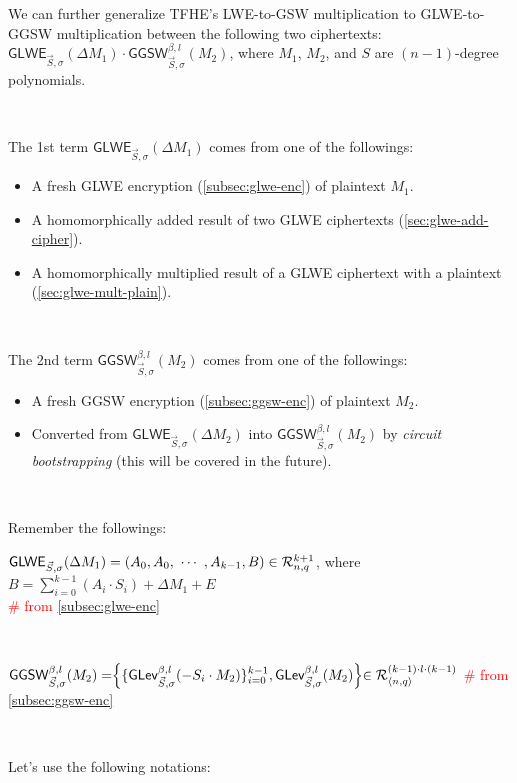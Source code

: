 We can further generalize TFHE's LWE-to-GSW multiplication to GLWE-to-GGSW multiplication between the following two ciphertexts: $\textsf{GLWE}_{\vec{S}, \sigma}(\Delta M_1) \cdot \textsf{GGSW}_{\vec{S}, \sigma}^{\beta, l}(M_2)$, where $M_1$, $M_2$, and $S$ are $(n-1)$-degree polynomials. 


$ $

\noindent The 1st term $\textsf{GLWE}_{\vec{S}, \sigma}(\Delta M_1)$ comes from one of the followings: 
\begin{itemize}
\item A fresh GLWE encryption (\autoref{subsec:glwe-enc}) of plaintext $M_1$. 
\item A homomorphically added result of two GLWE ciphertexts (\autoref{sec:glwe-add-cipher}). 
\item A homomorphically multiplied result of a GLWE ciphertext with a plaintext (\autoref{sec:glwe-mult-plain}). 
\end{itemize}

$ $

\noindent The 2nd term $\textsf{GGSW}_{\vec{S}, \sigma}^{\beta, l}(M_2)$ comes from one of the followings:
\begin{itemize}
\item A fresh GGSW encryption (\autoref{subsec:ggsw-enc}) of plaintext $M_2$.
\item Converted from $\textsf{GLWE}_{\vec{S}, \sigma}(\Delta M_2)$ into $\textsf{GGSW}_{\vec{S}, \sigma}^{\beta, l}(M_2)$ by \textit{circuit bootstrapping} (this will be covered in the future).
\end{itemize}

$ $

\noindent Remember the followings: 

$\textsf{GLWE}_{\vec{S}, \sigma}(\Delta M_1) = (A_0, A_0, \text{ } \text{$\cdots$} \text{ }, A_{k-1}, B) \in \mathcal{R}_{n, q}^{k + 1}$, where $B = \sum\limits_{i=0}^{k-1}(A_i \cdot S_i) + \Delta M_1 + E$ \\ \textcolor{red}{\# from \autoref{subsec:glwe-enc}} 

$ $

$\textsf{GGSW}_{\vec{S}, \sigma}^{\beta, l}(M_2) = \Bigr \{ \{ \textsf{GLev}_{\vec{S}, \sigma}^{\beta, l} (-S_i \cdot M_2)  \}_{i=0}^{k-1}, \textsf{GLev}_{\vec{S}, \sigma}^{\beta, l}(M_2) \Bigl \} \in \mathcal{R}_{\langle n, q \rangle }^{(k-1) \cdot l \cdot (k-1)}$ \textcolor{red}{\# from \autoref{subsec:ggsw-enc}}

$ $

\noindent Let's use the following notations:

